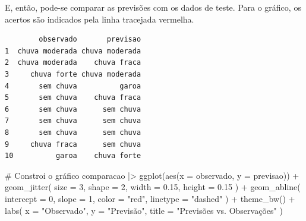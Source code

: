 \documentclass[
  letterpaper,
  DIV=11,
  numbers=noendperiod]{scrreprt}
\newenvironment{Shaded}{\begin{snugshade}}{\end{snugshade}}
\newcommand{\AttributeTok}[1]{\textcolor[rgb]{0.40,0.45,0.13}{#1}}
\newcommand{\CommentTok}[1]{\textcolor[rgb]{0.37,0.37,0.37}{#1}}
\newcommand{\DecValTok}[1]{\textcolor[rgb]{0.68,0.00,0.00}{#1}}
\newcommand{\FloatTok}[1]{\textcolor[rgb]{0.68,0.00,0.00}{#1}}
\newcommand{\FunctionTok}[1]{\textcolor[rgb]{0.28,0.35,0.67}{#1}}
\newcommand{\NormalTok}[1]{\textcolor[rgb]{0.00,0.23,0.31}{#1}}
\newcommand{\OtherTok}[1]{\textcolor[rgb]{0.00,0.23,0.31}{#1}}
\newcommand{\SpecialCharTok}[1]{\textcolor[rgb]{0.37,0.37,0.37}{#1}}
\newcommand{\StringTok}[1]{\textcolor[rgb]{0.13,0.47,0.30}{#1}}
\begin{document}
E, então, pode-se comparar as previsões com os dados de teste. Para o
gráfico, os acertos são indicados pela linha tracejada vermelha.

\begin{Shaded}
\end{Shaded}

\begin{verbatim}
        observado       previsao
1  chuva moderada chuva moderada
2  chuva moderada    chuva fraca
3     chuva forte chuva moderada
4       sem chuva          garoa
5       sem chuva    chuva fraca
6       sem chuva      sem chuva
7       sem chuva      sem chuva
8       sem chuva      sem chuva
9     chuva fraca      sem chuva
10          garoa    chuva forte
\end{verbatim}

\begin{Shaded}
\begin{Highlighting}[]
\CommentTok{\# Constroi o gráfico}
\NormalTok{comparacao }\SpecialCharTok{|\textgreater{}}
    \FunctionTok{ggplot}\NormalTok{(}\FunctionTok{aes}\NormalTok{(}\AttributeTok{x =}\NormalTok{ observado, }\AttributeTok{y =}\NormalTok{ previsao)) }\SpecialCharTok{+}
    \FunctionTok{geom\_jitter}\NormalTok{(}
        \AttributeTok{size =} \DecValTok{3}\NormalTok{, }\AttributeTok{shape =} \DecValTok{2}\NormalTok{,}
        \AttributeTok{width =} \FloatTok{0.15}\NormalTok{, }\AttributeTok{height =} \FloatTok{0.15}
\NormalTok{    ) }\SpecialCharTok{+}
    \FunctionTok{geom\_abline}\NormalTok{(}
        \AttributeTok{intercept =} \DecValTok{0}\NormalTok{,}
        \AttributeTok{slope =} \DecValTok{1}\NormalTok{,}
        \AttributeTok{color =} \StringTok{"red"}\NormalTok{,}
        \AttributeTok{linetype =} \StringTok{"dashed"}
\NormalTok{    ) }\SpecialCharTok{+}
    \FunctionTok{theme\_bw}\NormalTok{() }\SpecialCharTok{+}
    \FunctionTok{labs}\NormalTok{(}
        \AttributeTok{x =} \StringTok{"Observado"}\NormalTok{,}
        \AttributeTok{y =} \StringTok{"Previsão"}\NormalTok{,}
        \AttributeTok{title =} \StringTok{"Previsões vs. Observações"}
\NormalTok{    )}
\end{Highlighting}
\end{Shaded}
\end{document}
